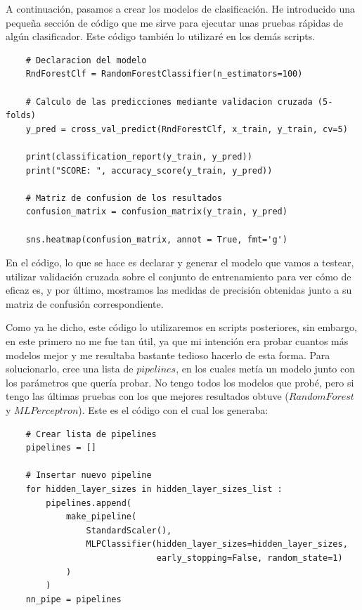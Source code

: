 \documentclass[11pt,a4paper]{article}
\begin{document}
A continuación, pasamos a crear los modelos de clasificación. He introducido una pequeña sección de código que me sirve para
ejecutar unas pruebas rápidas de algún clasificador. Este código también lo utilizaré en los demás scripts.
\label{rf}

\newpage
\begin{lstlisting}
    # Declaracion del modelo
    RndForestClf = RandomForestClassifier(n_estimators=100)
    
    # Calculo de las predicciones mediante validacion cruzada (5-folds)
    y_pred = cross_val_predict(RndForestClf, x_train, y_train, cv=5)
    
    print(classification_report(y_train, y_pred))
    print("SCORE: ", accuracy_score(y_train, y_pred))
    
    # Matriz de confusion de los resultados
    confusion_matrix = confusion_matrix(y_train, y_pred)
    
    sns.heatmap(confusion_matrix, annot = True, fmt='g')
\end{lstlisting}


En el código, lo que se hace es declarar y generar el modelo que vamos a testear, utilizar validación cruzada sobre el conjunto
de entrenamiento para ver cómo de eficaz es, y por último, mostramos las medidas de precisión obtenidas junto a su matriz de
confusión correspondiente.

Como ya he dicho, este código lo utilizaremos en scripts posteriores, sin embargo, en este primero no me fue tan útil, ya que
mi intención era probar cuantos más modelos mejor y me resultaba bastante tedioso hacerlo de esta forma. Para solucionarlo, cree
una lista de $pipelines$, en los cuales metía un modelo junto con los parámetros que quería probar. No tengo todos los modelos que
probé, pero si tengo las últimas pruebas con los que mejores resultados obtuve ($RandomForest$ y $MLPerceptron$). Este es el código
con el cual los generaba:

\label{mlp}
\begin{lstlisting}
    # Crear lista de pipelines
    pipelines = []

    # Insertar nuevo pipeline
    for hidden_layer_sizes in hidden_layer_sizes_list :
        pipelines.append(
            make_pipeline(
                StandardScaler(),
                MLPClassifier(hidden_layer_sizes=hidden_layer_sizes,
                              early_stopping=False, random_state=1)
            )
        )
    nn_pipe = pipelines
\end{lstlisting}
\end{document}
